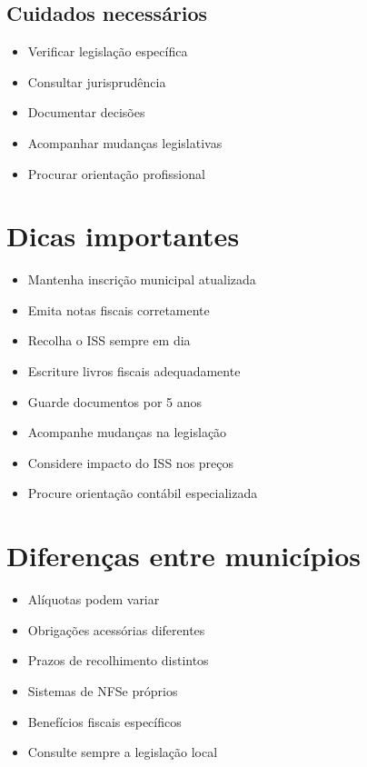 \documentclass[12pt,a4paper]{article}
\begin{document}
\subsection{Cuidados necessários}
\begin{itemize}
    \item Verificar legislação específica
    \item Consultar jurisprudência
    \item Documentar decisões
    \item Acompanhar mudanças legislativas
    \item Procurar orientação profissional
\end{itemize}

\section{Dicas importantes}

\begin{itemize}
    \item Mantenha inscrição municipal atualizada
    \item Emita notas fiscais corretamente
    \item Recolha o ISS sempre em dia
    \item Escriture livros fiscais adequadamente
    \item Guarde documentos por 5 anos
    \item Acompanhe mudanças na legislação
    \item Considere impacto do ISS nos preços
    \item Procure orientação contábil especializada
\end{itemize}

\section{Diferenças entre municípios}

\begin{itemize}
    \item Alíquotas podem variar
    \item Obrigações acessórias diferentes
    \item Prazos de recolhimento distintos
    \item Sistemas de NFSe próprios
    \item Benefícios fiscais específicos
    \item Consulte sempre a legislação local
\end{itemize}
\end{document}
